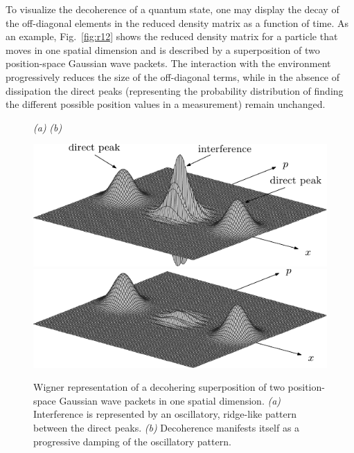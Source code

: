 \documentclass[3p,sort&compress]{elsarticle}
\begin{document}
To visualize the decoherence of a quantum state, one may display the decay of the off-diagonal elements in the reduced density matrix as a function of time. As an example, Fig.~\ref{fig:r12} shows the reduced density matrix for a particle that moves in one spatial dimension and is described by a superposition of two position-space Gaussian wave packets. The interaction with the environment progressively reduces the size of the off-diagonal terms, while in the absence of dissipation the direct peaks (representing the probability distribution of finding the different possible position values in a measurement) remain unchanged. 

\begin{figure}
{\footnotesize \hspace{1.1cm}\emph{(a)} \hspace{6.9cm} \emph{(b)}}

\centering
\includegraphics[scale=.65]{wigexample.pdf} \hspace{1.5cm}
\includegraphics[scale=.65]{wigexdec.pdf}
\caption{Wigner representation of a decohering superposition of
  two position-space Gaussian wave packets in one spatial dimension. \emph{(a)} Interference is represented by an oscillatory, ridge-like pattern between the direct peaks. \emph{(b)} Decoherence manifests itself as a progressive damping of the oscillatory pattern.}
\label{fig:wig}
\end{figure}
\end{document}
